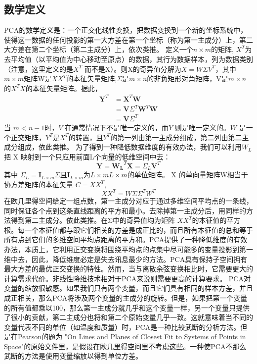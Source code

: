 \subsection{数学定义}
PCA的数学定义是：一个正交化线性变换，把数据变换到一个新的坐标系统中，使得这一数据的任何投影的第一大方差在第一个坐标（称为第一主成分）上，第二大方差在第二个坐标（第二主成分）上，依次类推。
定义一个$n\times m$的矩阵, $X^T$为去平均值（以平均值为中心移动至原点）的数据，其行为数据样本，列为数据类别（注意，这里定义的是$X^T$ 而不是X）。则X的奇异值分解为$X = W\Sigma V^T$，其中$m\times m$矩阵W是$XX^T$的本征矢量矩阵,$\Sigma$是$m\times n$的非负矩形对角矩阵，V是$m\times n$的$X^TX$的本征矢量矩阵。据此，
\begin{equation}
\begin{aligned}
\mathbf{Y}^T&=\mathbf{X}^{T}\mathbf{W}\\
            &=\mathbf{V}{\Sigma}^{T}\mathbf{W}^{T}\mathbf{W}\\
            &=\mathbf{V}{\Sigma}^{T}
\end{aligned}
\end{equation}
当 $m < n − 1$时，$V$ 在通常情况下不是唯一定义的，而$Y$ 则是唯一定义的。$W$ 是一个正交矩阵，$Y^T$是$X^T$的转置，且$Y^T$的第一列由第一主成分组成，第二列由第二主成分组成，依此类推。
为了得到一种降低数据维度的有效办法，我们可以利用$W_L$把 X 映射到一个只应用前面L个向量的低维空间中去：
\begin{equation}
\mathbf{Y} =\mathbf{W_{L}}^{T}\mathbf{X} ={\Sigma _{L}}\mathbf {V} ^{T}
\end{equation}
其中 ${\Sigma _{L}} =\mathbf{I} _{L\times m}{\Sigma }$且$\mathbf{I} _{L\times m} $为$ L\times m L\times m$的单位矩阵。
X 的单向量矩阵W相当于协方差矩阵的本征矢量 $C=XX^T$,
\begin{equation}
XX^T = W\Sigma\Sigma^TW^T
\end{equation}
在欧几里得空间给定一组点数，第一主成分对应于通过多维空间平均点的一条线，同时保证各个点到这条直线距离的平方和最小。去除掉第一主成分后，用同样的方法得到第二主成分。依此类推。在Σ中的奇异值均为矩阵 $XX^T$的本征值的平方根。每一个本征值都与跟它们相关的方差是成正比的，而且所有本征值的总和等于所有点到它们的多维空间平均点距离的平方和。PCA提供了一种降低维度的有效办法，本质上，它利用正交变换将围绕平均点的点集中尽可能多的变量投影到第一维中去，因此，降低维度必定是失去讯息最少的方法。PCA具有保持子空间拥有最大方差的最优正交变换的特性。然而，当与离散余弦变换相比时，它需要更大的计算需求代价。非线性降维技术相对于PCA来说则需要更高的计算要求。
PCA对变量的缩放很敏感。如果我们只有两个变量，而且它们具有相同的样本方差，并且成正相关，那么PCA将涉及两个变量的主成分的旋转。但是，如果把第一个变量的所有值都乘以100，那么第一主成分就几乎和这个变量一样，另一个变量只提供了很小的贡献，第二主成分也将和第二个原始变量几乎一致。这就意味着当不同的变量代表不同的单位（如温度和质量）时，PCA是一种比较武断的分析方法。但是在Pearson的题为 "On Lines and Planes of Closest Fit to Systems of Points in Space"的原始文件里，是假设在欧几里得空间里不考虑这些。一种使PCA不那么武断的方法是使用变量缩放以得到单位方差。
